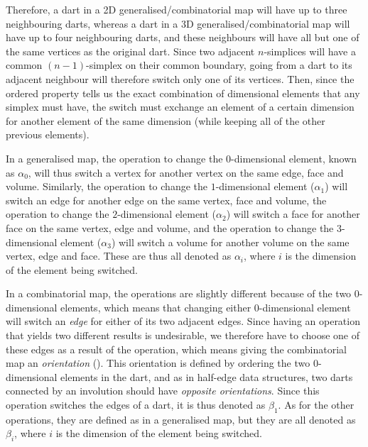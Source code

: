 Therefore, a dart in a 2D generalised/combinatorial map will have up to three neighbouring darts, whereas a dart in a 3D generalised/combinatorial map will have up to four neighbouring darts, and these neighbours will have all but one of the same vertices as the original dart.
Since two adjacent \(n\)-simplices will have a common \((n-1)\)-simplex on their common boundary, going from a dart to its adjacent neighbour will therefore switch only one of its vertices.
Then, since the ordered property tells us the exact combination of dimensional elements that any simplex must have, the switch must exchange an element of a certain dimension for another element of the same dimension (while keeping all of the other previous elements).

In a generalised map, the operation to change the \(0\)-dimensional element, known as \(\alpha_0\), will thus switch a vertex for another vertex on the same edge, face and volume.
Similarly, the operation to change the \(1\)-dimensional element (\(\alpha_1\)) will switch an edge for another edge on the same vertex, face and volume, the operation to change the \(2\)-dimensional element (\(\alpha_2\)) will switch a face for another face on the same vertex, edge and volume, and the operation to change the \(3\)-dimensional element (\(\alpha_3\)) will switch a volume for another volume on the same vertex, edge and face.
These are thus all denoted as \(\alpha_i\), where \(i\) is the dimension of the element being switched.

In a combinatorial map, the operations are slightly different because of the two \(0\)-dimensional elements, which means that changing either \(0\)-dimensional element will switch an \emph{edge} for either of its two adjacent edges.
Since having an operation that yields two different results is undesirable, we therefore have to choose one of these edges as a result of the operation, which means giving the combinatorial map an \emph{orientation} ().
This orientation is defined by ordering the two \(0\)-dimensional elements in the dart, and as in half-edge data structures, two darts connected by an involution should have \emph{opposite orientations}.
Since this operation switches the edges of a dart, it is thus denoted as \(\beta_1\).
As for the other operations, they are defined as in a generalised map, but they are all denoted as \(\beta_i\), where \(i\) is the dimension of the element being switched.

